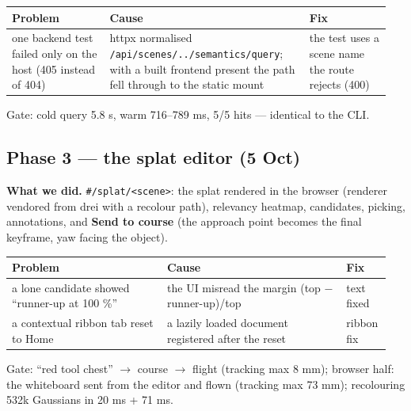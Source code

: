 \documentclass[11pt,a4paper]{article}
\newcommand{\code}[1]{\texttt{#1}}
\begin{document}
\begin{center}\small
\begin{tabular}{@{}>{\raggedright\arraybackslash}p{0.248\linewidth}>{\raggedright\arraybackslash}p{0.496\linewidth}>{\raggedright\arraybackslash}p{0.203\linewidth}@{}}
\toprule
\textbf{Problem} & \textbf{Cause} & \textbf{Fix} \\
\midrule
one backend test failed only on the host (405 instead of 404) & httpx normalised \code{/\allowbreak{}api/\allowbreak{}scenes/\allowbreak{}../\allowbreak{}semantics/\allowbreak{}query}; with a built frontend present the path fell through to the static mount & the test uses a scene name the route rejects (400) \\
\bottomrule
\end{tabular}
\end{center}
Gate: cold query 5.8 s, warm 716–789 ms, 5/5 hits — identical to the CLI.

\subsection{Phase 3 — the splat editor (5 Oct)}
\textbf{What we did.} \code{\#/\allowbreak{}splat/\allowbreak{}<scene>}: the splat rendered in the browser (renderer vendored from drei with a recolour path), relevancy heatmap, candidates, picking, annotations, and \textbf{Send to course} (the approach point becomes the final keyframe, yaw facing the object).

\begin{center}\small
\begin{tabular}{@{}>{\raggedright\arraybackslash}p{0.391\linewidth}>{\raggedright\arraybackslash}p{0.454\linewidth}>{\raggedright\arraybackslash}p{0.103\linewidth}@{}}
\toprule
\textbf{Problem} & \textbf{Cause} & \textbf{Fix} \\
\midrule
a lone candidate showed ``runner-up at 100 \%'' & the UI misread the margin (top $-$ runner-up)/top & text fixed \\
a contextual ribbon tab reset to Home & a lazily loaded document registered after the reset & ribbon fix \\
\bottomrule
\end{tabular}
\end{center}
Gate: ``red tool chest'' $\rightarrow$ course $\rightarrow$ flight (tracking max 8 mm); browser half: the whiteboard sent from the editor and flown (tracking max 73 mm); recolouring 532k Gaussians in 20 ms + 71 ms.
\end{document}
